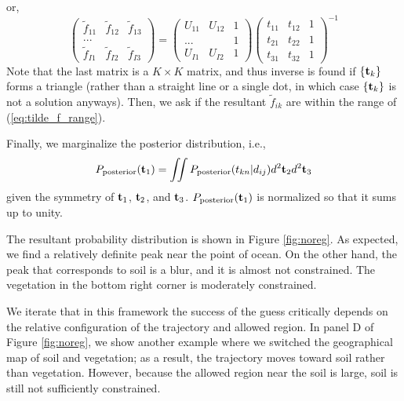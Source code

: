 \documentclass[iop,numberedappendix,apj,]{emulateapj}
\def\fast{\tilde f}
\begin{document}
or,
\begin{equation}
\begin{pmatrix}
\fast_{11} & \fast_{12} & \fast_{13}  \\
... & \\
\fast_{I1} & \fast_{I2} & \fast_{I3}
\end{pmatrix}
=
\begin{pmatrix}
U_{11} & U_{12} & 1 \\
... & & 1 \\
U_{I1} & U_{I2} & 1 
\end{pmatrix}
\begin{pmatrix}
t_{11} & t_{12} & 1 \\
t_{21} & t_{22} & 1 \\
t_{31} & t_{32} & 1 
\end{pmatrix}^{-1}
\label{eq:f=ds-1}
\end{equation}
Note that the last matrix is a $K\times K$ matrix, and thus inverse is found if $\{ {\bf t}_k \}$ forms a triangle (rather than a straight line or a single dot, in which case $\{ {\bf t}_k \}$ is not a solution anyways).
Then, we ask if the resultant $\fast_{ik}$ are within the range of (\ref{eq:tilde_f_range}). 

Finally, we marginalize the posterior distribution, i.e.,
\begin{equation} 
P_{\rm posterior} ( {\bf t}_1) = \iint P_{\rm posterior} ( t_{kn} | d_{ij} ) d^2 {\bf t}_2 d^2 {\bf t}_3
\end{equation}
given the symmetry of ${\bf t}_1$, ${\bf t}_2$, and ${\bf t}_3$. 
$P_{\rm posterior} ( {\bf t}_1) $ is normalized so that it sums up to unity. 

The resultant probability distribution is shown in Figure \ref{fig:noreg}. 
As expected, we find a relatively definite peak near the point of ocean. 
On the other hand, the peak that corresponds to soil is a blur, and it is almost not constrained. 
The vegetation in the bottom right corner is moderately constrained. 

We iterate that in this framework the success of the guess critically depends on the relative configuration of the trajectory and allowed region. 
In panel D of Figure \ref{fig:noreg}, we show another example where we switched the geographical map of soil and vegetation; as a result, the trajectory moves toward soil rather than vegetation. However, because the allowed region near the soil is large, soil is still not sufficiently constrained. 
\end{document}
